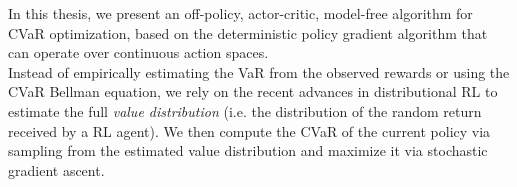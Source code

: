 In this thesis, we present an off-policy, actor-critic, model-free algorithm for CVaR optimization,
based on the deterministic policy gradient algorithm that can operate over continuous action spaces.\\
Instead of empirically estimating the VaR from the observed rewards or using the CVaR
Bellman equation, we rely on the recent advances in distributional RL 
\citep{Bellemare2017,Dabney2018a,Dabney2018b} to estimate the full
\textit{value distribution} (i.e. the distribution of the random return received by a RL agent).
We then compute the CVaR of the current policy via sampling from the estimated value distribution
and maximize it via stochastic gradient ascent.








